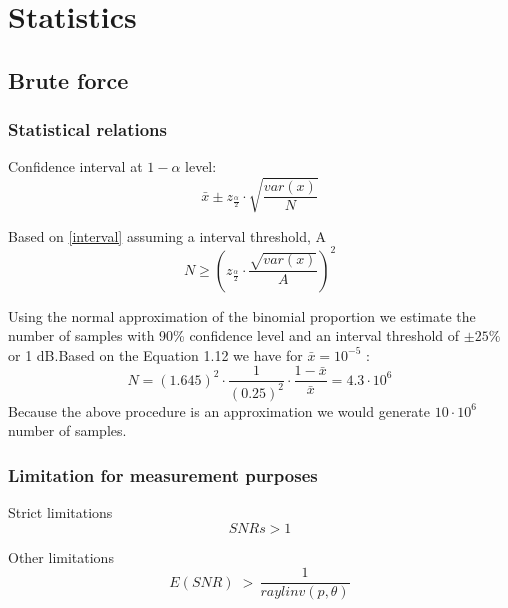 \chapter{Statistics}

\section{Brute force}
\subsection{Statistical relations}


Confidence interval at $1-\alpha$ level:
\begin{equation}\label{interval}
\bar{x} \pm z_{\frac{\alpha}{2}} \cdot \sqrt{\frac{var(x)}{N}}
\end{equation}

Based on \autoref{interval} assuming a interval threshold, A
\begin{equation}\label{interval2}
N \geq \left(z_{\frac{\alpha}{2}} \cdot \frac{\sqrt{var(x)}}{A} \right)^2
\end{equation}

Using the normal approximation of the binomial proportion we  estimate the number of samples with 90\% confidence level and an interval threshold of $\pm 25\%$ or 1 dB.Based on the Equation 1.12 we have for $ \bar{x} = 10^{-5} $ :
\begin{equation}\label{sampleEQ}
N=(1.645)^{2} \cdot \frac{1}{(0.25)^{2}} \cdot \frac{1-\bar{x}}{\bar{x}} = 4.3 \cdot 10^{6}
\end{equation}
Because the above procedure is an approximation we would generate $ 10 \cdot 10^{6} $ number of samples.
\subsection{Limitation for measurement purposes}

Strict limitations
\begin{equation}
SNRs > 1
\end{equation}

Other limitations
\begin{equation}
E\left(SNR\right) \;>\, \frac{1}{raylinv(p,\theta)} 
\end{equation}

\begin{where}
\end{where}



